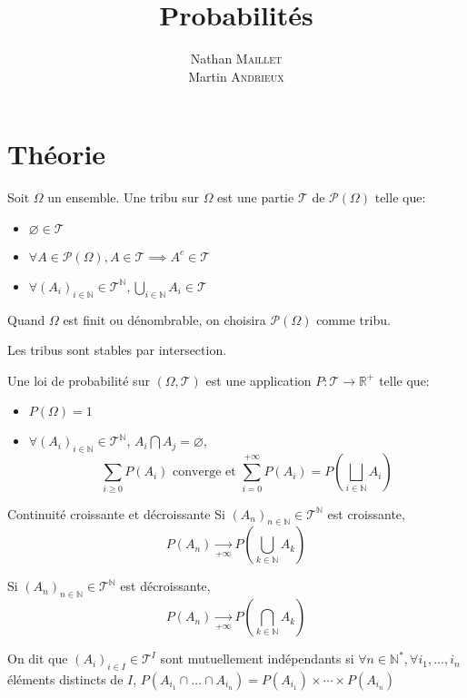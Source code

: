 \documentclass[french, a4paper, 10pt, twocolumn]{article}
\title{Probabilités}
\author{Nathan \textsc{Maillet}\\
  Martin \textsc{Andrieux}}
\date{}
\newcommand{\N}{\mathbb{N}}   %
\newcommand{\R}{\mathbb{R}}   %
\begin{document}
\maketitle

\section{Théorie}
\begin{definition}
  Soit \(\Omega\) un ensemble.
  Une tribu sur \(\Omega\) est une partie \(\mathcal{T}\) de \(\mathcal{P(\Omega)}\) telle que:
  \begin{itemize}[label=\(\bullet\)]
    \item \(\varnothing \in \mathcal{T}\)
    \item \(\forall A \in \mathcal{P(\Omega)}, A \in \mathcal{T} \implies A^c \in  \mathcal{T}\)
    \item \(\forall (A_i)_{i\in \N} \in \mathcal{T}^{\N}, \bigcup_{i\in \N}A_i \in \mathcal{T}\)
  \end{itemize}
  \tcblower
  Quand \(\Omega\) est finit ou dénombrable, on choisira \(\mathcal{P(\Omega)}\) comme tribu.

  Les tribus sont stables par intersection.
\end{definition}

\begin{definition}
  Une loi de probabilité sur $(\Omega,\mathcal{T})$ est une application \(P: \mathcal{T} \rightarrow \R^+\) telle que:
  \begin{itemize}[label=\(\bullet\)]
    \item \(P(\Omega)=1\)
    \item \(\forall {(A_i)}_{i\in \N} \in \mathcal{T}^{\N}\), \(A_i\bigcap A_j =\varnothing\),
      \[\sum_{i\geqslant 0}P(A_i) \text{ converge et } \sum_{i=0}^{+\infty}P(A_i)=P\left(\bigsqcup_{i\in \N}A_i\right)\]
  \end{itemize}
\end{definition}

\begin{theoreme}{Continuité croissante et décroissante}
  Si \({(A_n)}_{n\in \N} \in \mathcal{T}^{\N}\) est croissante, \[P(A_n)\xrightarrow[+\infty]{}P\left(\bigcup_{k\in \N}A_{k}\right)\]

  Si \((A_n)_{n\in \N} \in \mathcal{T}^{\N}\) est décroissante, \[P(A_n)\xrightarrow[+\infty]{}P\left(\bigcap_{k\in \N}A_{k}\right)\]
\end{theoreme}

\begin{definition}
  On dit que \({(A_i)}_{i \in I} \in \mathcal{T}^I\) sont mutuellement indépendants si \(\forall n \in \N^*, \forall i_1,\dots,i_n\)
  éléments distincts de \(I\), \(P(A_{i_1}\cap\dots\cap A_{i_n})=P(A_{i_1})\times\cdots\times P(A_{i_n})\)
\end{definition}
\end{document}
